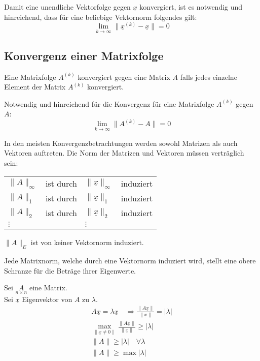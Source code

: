 Damit eine unendliche Vektorfolge gegen $\underline{x}$ konvergiert, ist es notwendig und hinreichend, dass f\"ur eine beliebige Vektornorm folgendes gilt:
\begin{equation}
  \lim_{k \rightarrow\infty} \|\underline{x}^{(k)} - \underline{x}\| = 0
\end{equation}


\subsection{Konvergenz einer Matrixfolge}
Eine Matrixfolge $A^{(k)}$ konvergiert gegen eine Matrix $A$ falls jedes einzelne Element der Matrix $A^{(k)}$ konvergiert.

Notwendig und hinreichend f\"ur die Konvergenz f\"ur eine Matrixfolge $A^{(k)}$ gegen $A$:
\begin{equation}
  \lim_{k \rightarrow\infty} \|A^{(k)}-A\| =0
\end{equation}

In den meisten Konvergenzbetrachtungen werden sowohl Matrizen als auch Vektoren auftreten.
Die Norm der Matrizen und Vektoren m\"ussen vertr\"aglich sein:
\begin{center}\begin{tabular}{p{2cm} p{1.5cm} p{2cm} p{1.5cm}}
  $\|A\|_\infty$ & ist durch & $\|\underline{x}\|_\infty$ & induziert \\
  $\|A\|_1$      & ist durch & $\|\underline{x}\|_1$      & induziert \\
  $\|A\|_2$      & ist durch & $\|\underline{x}\|_2$      & induziert \\
  $\vdots$       &           & $\vdots$                   & \\
\end{tabular}\end{center}
$\|A\|_E$ ist von keiner Vektornorm induziert.

\noindent Jede Matrixnorm, welche durch eine Vektornorm induziert wird, stellt eine obere Schranze f\"ur die Betr\"age ihrer Eigenwerte.

\noindent Sei $\underset{n\times n}{A}$ eine Matrix.\\
\noindent Sei $\underline{x}$ Eigenvektor von $A$ zu $\lambda$.
\begin{gather}
  A\underline{x} = \lambda\underline{x} \quad\Longrightarrow\frac{\|A\underline{x}\|}{\|\underline{x}\|} = |\lambda| \\
  \max_{\|\underline{x}\neq 0\|} \frac{\|A\underline{x}\|}{\|\underline{x}\|} \geq |\lambda| \\
  \|A\| \geq |\lambda|\quad\forall\lambda \\
  \|A\| \geq \max |\lambda |
\end{gather}


